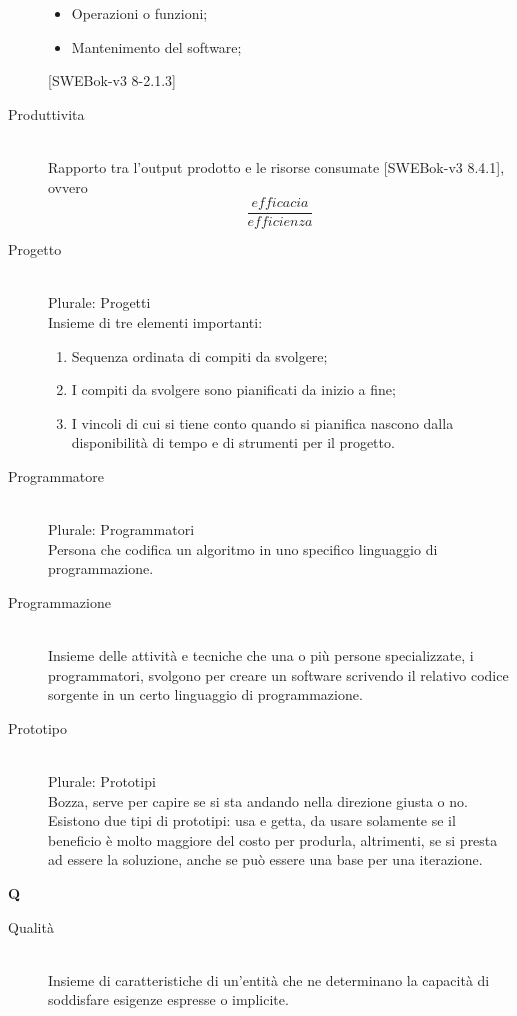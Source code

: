 \begin{description}
\begin{itemize}
\item Operazioni o funzioni;
\item Mantenimento del software;
\end{itemize}
[SWEBok-v3 8-2.1.3]
 \item[Produttivita] \hfill \\
Rapporto tra l'output prodotto e le risorse consumate [SWEBok-v3 8.4.1], ovvero \[\frac{efficacia}{efficienza}\]
 \item[Progetto] \hfill \\
Plurale: Progetti\\ 
Insieme di tre elementi importanti: \begin{enumerate}
\item Sequenza ordinata di compiti da svolgere;
\item I compiti da svolgere sono pianificati da inizio a fine;
\item I vincoli di cui si tiene conto quando si pianifica nascono dalla disponibilità di tempo e di strumenti per il progetto.
\end{enumerate}
 \item[Programmatore] \hfill \\
Plurale: Programmatori\\ 
Persona che codifica un algoritmo in uno specifico linguaggio di programmazione.
 \item[Programmazione] \hfill \\
Insieme delle attività e tecniche che una o più persone specializzate, i programmatori, svolgono per creare un software scrivendo il relativo codice sorgente in un certo linguaggio di programmazione.
 \item[Prototipo] \hfill \\
Plurale: Prototipi\\ 
Bozza, serve per capire se si sta andando nella direzione giusta o no. Esistono due tipi di prototipi: usa e getta, da usare solamente se il beneficio è molto maggiore del costo per produrla, altrimenti, se si presta ad essere la soluzione, anche se può essere una base per una iterazione.
 \end{description}
\newpage 
\begin{center}\textbf{\Huge{Q}}\end{center}
\begin{description}\item[Qualità] \hfill \\
Insieme di caratteristiche di un'entità che ne determinano la capacità di soddisfare esigenze espresse o implicite.
 \end{description}
